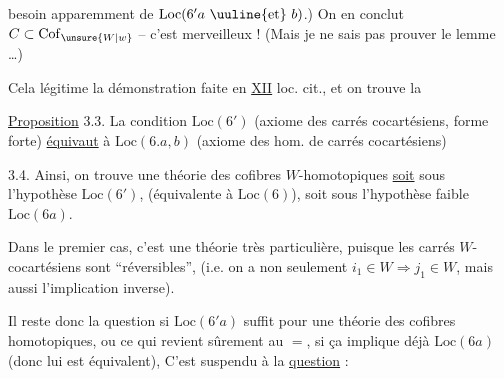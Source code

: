 
besoin apparemment de $\mathrm{Loc}(6'a\ \text{\uuline{et}}\ b)$.) On en conclut $C\subset\mathrm{Cof}_{\unsure{W|w}}$ -- c'est merveilleux ! (Mais je ne sais pas prouver le lemme \ldots)

Cela légitime la démonstration faite en \uline{XII} loc. cit., et on trouve la

\uline{Proposition} 3.3. La condition $\mathrm{Loc}(6')$ (axiome des carrés cocartésiens, forme forte)  \uline{équivaut} à $\mathrm{Loc}(6.a,b)$ (axiome des hom. de carrés cocartésiens) 

3.4. Ainsi, on trouve une théorie des cofibres $W$-homotopiques \uline{soit} sous l'hypothèse $\mathrm{Loc}(6')$, (équivalente à $\mathrm{Loc}(6)$), soit sous l'hypothèse  faible $\mathrm{Loc}(6a)$.

Dans le premier cas, c'est une théorie  très particulière, puisque les carrés $W$-cocartésiens sont ``réversibles'', (i.e. on a  non seulement $i_1\in W\Longrightarrow j_1\in W$, mais aussi l'implication inverse).

Il reste donc la question si $\mathrm{Loc}(6'a)$  suffit pour une théorie des cofibres homotopiques, ou ce qui revient sûrement au $=$, si ça implique déjà $\mathrm{Loc}(6a)$ (donc lui est équivalent), C'est  suspendu à la \uline{question} :
